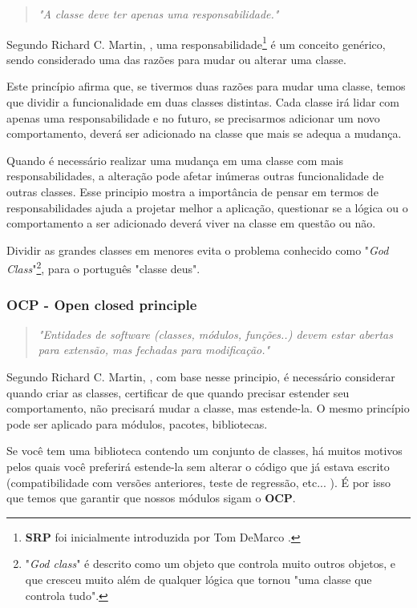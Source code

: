 \documentclass[12pt]{article}
\begin{document}
\begin{quote}
	\textit{"A classe deve ter apenas uma responsabilidade."}
\end{quote}

Segundo Richard C. Martin, \cite{ROBERT_MARTIN_THE_CLEAN_ARCHITECTURE}, uma responsabilidade\footnote{\textbf{SRP} foi inicialmente introduzida por Tom DeMarco \cite{SASS_SRP}.} é um conceito genérico, sendo considerado uma das razões para mudar ou alterar uma classe. 

Este princípio afirma que, se tivermos duas razões para mudar uma classe, temos que dividir a funcionalidade em duas classes distintas. Cada classe irá lidar com apenas uma responsabilidade e no futuro, se precisarmos adicionar um novo comportamento, deverá ser adicionado na classe que mais se adequa a mudança.

Quando é necessário realizar uma mudança em uma classe com mais responsabilidades, a alteração pode afetar inúmeras outras funcionalidade de outras classes. Esse principio mostra a importância de pensar em termos de responsabilidades ajuda a projetar melhor a aplicação, questionar se a lógica ou o comportamento a ser adicionado deverá viver na classe em questão ou não.

Dividir as grandes classes em menores evita o problema conhecido como "\textit{God Class}"\footnote{"\textit{God class}" é descrito como um objeto que controla muito outros objetos, e que cresceu muito além de qualquer lógica que tornou "uma classe que controla tudo".}\cite{GOD_CLASS}, para o português "classe deus". 


\subsubsection{OCP - Open closed principle}

\begin{quote}
	\textit{"Entidades de software (classes, módulos, funções..) devem estar abertas para extensão, mas fechadas para modificação."}	
\end{quote}

Segundo Richard C. Martin, \cite{ROBERT_MARTIN_THE_CLEAN_ARCHITECTURE}, com base nesse principio, é necessário considerar quando criar as classes, certificar de que quando precisar estender seu comportamento, não precisará mudar a classe, mas estende-la. O mesmo princípio pode ser aplicado para módulos, pacotes, bibliotecas.

Se você tem uma biblioteca contendo um conjunto de classes, há muitos motivos pelos quais você preferirá estende-la sem alterar o código que já estava escrito (compatibilidade com versões anteriores, teste de regressão, etc... ). É por isso que temos que garantir que nossos módulos sigam o \textbf{OCP}.
\end{document}
